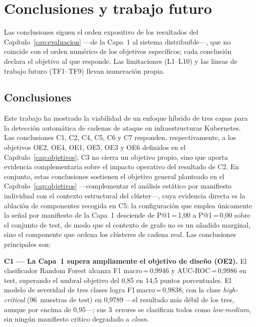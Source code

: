 \chapter{Conclusiones y trabajo futuro}
\label{cap:conclusiones}

Las conclusiones siguen el orden expositivo de los resultados del
Capítulo~\ref{cap:evaluacion} —de la Capa~1 al sistema distribuible\mbox{—,} que no
coincide con el orden numérico de los objetivos específicos; cada conclusión
declara el objetivo al que responde. Las limitaciones (L1--L10) y las líneas de
trabajo futuro (TF1--TF9) llevan numeración propia.

\section{Conclusiones}
\label{sec:conclusiones_finales}

Este trabajo ha mostrado la viabilidad de un enfoque híbrido de tres capas para la
detección automática de cadenas de ataque en infraestructuras Kubernetes. Las
conclusiones C1, C2, C4, C5, C6 y C7 responden, respectivamente, a los objetivos OE2,
OE4, OE1, OE5, OE3 y OE6 definidos en el Capítulo~\ref{cap:objetivos}; C3 no cierra un
objetivo propio, sino que aporta evidencia complementaria sobre el impacto operativo
del resultado de C2. En conjunto, estas conclusiones sostienen el objetivo general
planteado en el Capítulo~\ref{cap:objetivos} —complementar el análisis estático por
manifiesto individual con el contexto estructural del clúster\mbox{—,} cuya evidencia
directa es la ablación de componentes recogida en C5: la configuración que emplea
únicamente la señal por manifiesto de la Capa~1 desciende de P@1\,=\,1,00 a
P@1\,=\,0,00 sobre el conjunto de test, de modo que el contexto de grafo no es un
añadido marginal, sino el componente que ordena los clústeres de cadena real. Las
conclusiones principales son:

\textbf{C1 — La Capa~1 supera ampliamente el objetivo de diseño (OE2).} El clasificador
Random Forest alcanza F1 macro\,=\,0,9946 y \ac{AUC}-\ac{ROC}\,=\,0,9986 en test, superando
el umbral objetivo del 0,85 en 14,5 puntos porcentuales. El modelo de severidad de
tres clases logra F1\,macro\,=\,0,9838, con la clase \textit{high-critical} (96~muestras
de test) en 0,9789 —el resultado más débil de los tres, aunque por encima de 0,95\mbox{—;}
sus 3~errores se clasifican todos como \textit{low-medium}, sin ningún manifiesto
crítico degradado a \textit{clean}.

